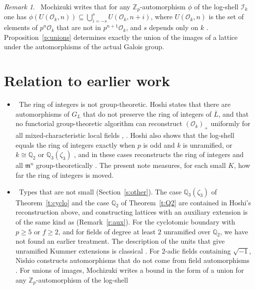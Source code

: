 \documentclass[11pt,a4paper]{article}
\newcommand{\Zp}{\mathbb{Z}_p}
\newcommand{\cO}{\mathcal{O}}
\newcommand{\cI}{\mathcal{I}}
\newcommand{\fm}{\mathfrak{m}}
\newcommand{\lab}[2]{{\upshape\fcolorbox{#1}{#1!8}{\scriptsize\sffamily\bfseries\textcolor{#1}{#2}}}}
\newcommand{\tagS}{\lab{blue}{S}}
\theoremstyle{plain}
\theoremstyle{definition}
\theoremstyle{remark}
\newtheorem{remark}[theorem]{Remark}
\begin{document}
\begin{remark}\label{r:EssLgc}
\tagS\ Mochizuki writes that for any $\Zp$-automorphism $\phi$ of the log-shell $\cI_k$ one has
$\phi(U(\cO_k,n))\subseteq\bigcup_{i=-s}^{s}U(\cO_k,n+i)$, where $U(\cO_k,n)$ is the set of elements of $p^n\cO_k$ that
are not in $p^{n+1}\cO_k$, and $s$ depends only on $k$ \cite[Ex.~3.5.1(ii)]{EssLgc}. Proposition~\ref{p:unions}
determines exactly the union of the images of a lattice under the automorphisms of the actual Galois group.
\end{remark}

\section{Relation to earlier work}\label{s:prior}
\begin{itemize}
\item \tagS\ The ring of integers is not group-theoretic. Hoshi states that there are automorphisms of $G_L$ that do
not preserve the ring of integers of $\overline L$, and that no functorial group-theoretic algorithm can reconstruct
$(\cO_k)_+$ uniformly for all mixed-characteristic local fields \cite[Rem.~4.3.1(ii)(iii)]{Hoshi},
\cite[Rem.~2.11.2]{HoshiTop}. Hoshi also shows that the log-shell equals the ring of integers exactly when $p$ is odd and
$k$ is unramified, or $k\cong\mathbb Q_2$ or $\mathbb Q_3(\zeta_3)$ \cite[Thm.~A(ii)]{HoshiTop}, and in these cases
reconstructs the ring of integers and all $\fm^n$ group-theoretically \cite[Def.~2.9, Summary~2.11(ii)]{HoshiTop}. The
present note measures, for each small $K$, how far the ring of integers is moved.
\item \tagS\ Types that are not small (Section~\ref{s:other}). The case $\mathbb Q_3(\zeta_3)$ of
Theorem~\ref{t:cyclo} and the case $\mathbb Q_2$ of Theorem~\ref{t:Q2} are contained in Hoshi's reconstruction above,
and constructing lattices with an auxiliary extension is of the same kind as \cite[Lemma~1.8(iv)]{HoshiTop}
(Remark~\ref{r:aux}). For the cyclotomic boundary with $p\ge5$ or $f\ge2$, and for fields of degree at least $2$
unramified over $\mathbb Q_2$, we have not found an earlier treatment. The description of the units that give
unramified Kummer extensions is classical \cite[Ch.~IV, (1.4) and \S1, Exercise~7]{FV}. For $2$-adic fields containing
$\sqrt{-1}$, Nishio constructs automorphisms that do not come from field automorphisms \cite[Thm.~1.6]{Nishio25}. For
unions of images, Mochizuki writes a bound in the form of a union for any $\Zp$-automorphism of the log-shell

\end{itemize}
\end{document}

